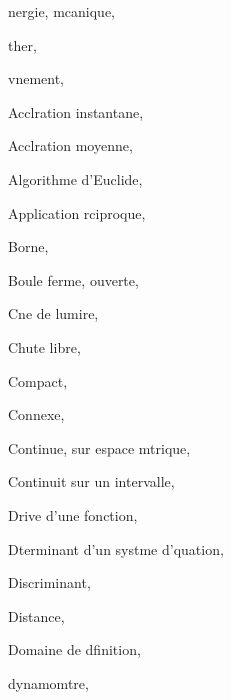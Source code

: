 \documentclass[a4paper,12pt]{book}
\theoremstyle{mes_exemples}	\newtheorem{exemple}[numtho]{Exemple}
\theoremstyle{mes_tho}
\begin{document}
\begin{theindex}

  \item {}nergie, 
    \subitem mcanique, 
  \item {}ther, 
  \item {}vnement, 

  \indexspace

  \item Acclration
    \subitem instantane, 
  \item Acclration moyenne, 
  \item Algorithme d'Euclide, 
  \item Application rciproque, 

  \indexspace

  \item Borne, 
  \item Boule
    \subitem ferme, 
    \subitem ouverte, 

  \indexspace

  \item Cne de lumire, 
  \item Chute libre, 
  \item Compact, 
  \item Connexe, 
  \item Continue, 
    \subitem sur espace mtrique, 
  \item Continuit sur un intervalle, 

  \indexspace

  \item Drive d'une fonction, 
  \item Dterminant d'un systme d'quation, 
  \item Discriminant, 
  \item Distance, 
  \item Domaine de dfinition, 
  \item dynamomtre, 

  \indexspace


\end{theindex}
\end{document}
